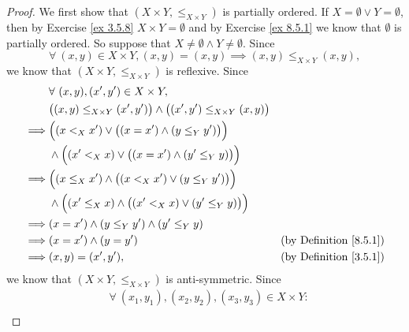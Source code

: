 \begin{proof}
    We first show that \((X \times Y, \leq_{X \times Y})\) is partially ordered.
    If \(X = \emptyset \lor Y = \emptyset\), then by Exercise \ref{ex 3.5.8} \(X \times Y = \emptyset\) and by Exercise \ref{ex 8.5.1} we know that \(\emptyset\) is partially ordered.
    So suppose that \(X \neq \emptyset \land Y \neq \emptyset\).
    Since
    \[
        \forall\ (x, y) \in X \times Y, (x, y) = (x, y) \implies (x, y) \leq_{X \times Y} (x, y),
    \]
    we know that \((X \times Y, \leq_{X \times Y})\) is reflexive.
    Since
    \begin{align*}
                 & \forall\ (x, y), (x', y') \in X \times Y,                                                                                          \\
                 & \big((x, y) \leq_{X \times Y} (x', y')\big) \land \big((x', y') \leq_{X \times Y} (x, y)\big)                                      \\
        \implies & \Big((x <_X x') \lor \big((x = x') \land (y \leq_Y y')\big)\Big)                                                                   \\
                 & \land \Big((x' <_X x) \lor \big((x = x') \land (y' \leq_Y y)\big)\Big)                                                             \\
        \implies & \Big((x \leq_X x') \land \big((x <_X x') \lor (y \leq_Y y')\big)\Big)                                                              \\
                 & \land \Big((x' \leq_X x) \land \big((x' <_X x) \lor (y' \leq_Y y)\big)\Big)                                                        \\
        \implies & (x = x') \land (y \leq_Y y') \land (y' \leq_Y y)                                                                                   \\
        \implies & (x = x') \land (y = y')                                                                       & \text{(by Definition \ref{8.5.1})} \\
        \implies & (x, y) = (x', y'),                                                                            & \text{(by Definition \ref{3.5.1})}
    \end{align*}
    we know that \((X \times Y, \leq_{X \times Y})\) is anti-symmetric.
    Since
    \begin{align*}
                 & \forall\ (x_1, y_1), (x_2, y_2), (x_3, y_3) \in X \times Y :                                                                                   \\

\end{align*}
\end{proof}
